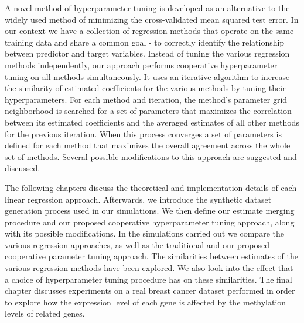 A novel method of hyperparameter tuning is developed as an alternative to the widely used method of minimizing the cross-validated mean squared test error. In our context we have a collection of regression methods that operate on the same training data and share a common goal - to correctly identify the relationship between predictor and target variables. Instead of tuning the various regression methods independently, our approach performs cooperative hyperparameter tuning on all methods simultaneously. It uses an iterative algorithm to increase the similarity of estimated coefficients for the various methods by tuning their hyperparameters. For each method and iteration, the method's parameter grid neighborhood is searched for a set of parameters that maximizes the correlation between its estimated coefficients and the averaged estimates of all other methods for the previous iteration. When this process converges a set of parameters is defined for each method that maximizes the overall agreement across the whole set of methods. Several possible modifications to this approach are suggested and discussed.

The following chapters discuss the theoretical and implementation details of each linear regression approach. Afterwards, we introduce the synthetic dataset generation process used in our simulations. We then define our estimate merging procedure and our proposed cooperative hyperparameter tuning approach, along with its possible modifications. In the simulations carried out we compare the various regression approaches, as well as the traditional and our proposed cooperative parameter tuning approach. The similarities between estimates of the various regression methods have been explored. We also look into the effect that a choice of hyperparameter tuning procedure has on these similarities. The final chapter discusses experiments on a real breast cancer dataset performed in order to explore how the expression level of each gene is affected by the methylation levels of related genes.
